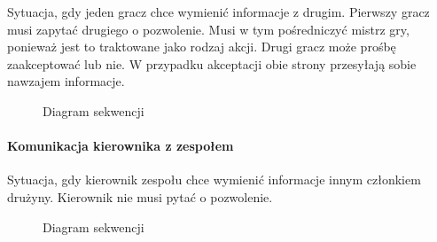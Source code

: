 \documentclass[11pt]{article}
\begin{document}
Sytuacja, gdy jeden gracz chce wymienić informacje z drugim. Pierwszy gracz musi zapytać drugiego o pozwolenie. Musi w tym pośredniczyć mistrz gry, ponieważ jest to traktowane jako rodzaj akcji. Drugi gracz może prośbę zaakceptować lub nie. W przypadku akceptacji obie strony przesyłają sobie nawzajem informacje.

\begin{figure}[!h]
	\centering
	\caption{Diagram sekwencji}
		\hspace*{-2.5cm}
\end{figure}
\FloatBarrier
\par

\paragraph{Komunikacja kierownika z zespołem}

Sytuacja, gdy kierownik zespołu chce wymienić informacje innym członkiem drużyny. Kierownik nie musi pytać o pozwolenie.

\begin{figure}[!h]
	\centering
	\caption{Diagram sekwencji}
\end{figure}
\FloatBarrier
\par
\end{document}
